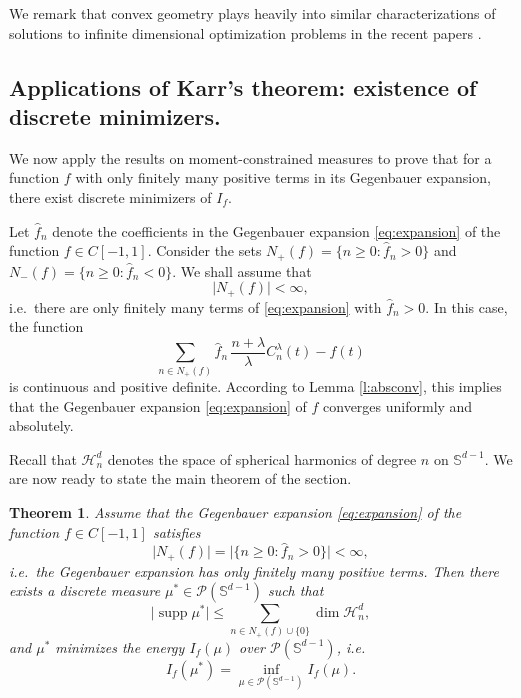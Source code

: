 \documentclass[11pt, leqno]{amsart}
\def\dim{\operatorname{dim}}
\def\S{\mathbb S}
\def\supp{\operatorname{supp}}
\newtheorem{theorem}{Theorem}[section]
\theoremstyle{definition}
\numberwithin{equation}{section}
\begin{document}
We remark that convex geometry plays heavily into similar characterizations of solutions to infinite dimensional optimization problems in the recent papers \cite{boyer,chandra,unser}.


\subsection{Applications of Karr's theorem: existence of discrete minimizers.}
We now apply the results on moment-constrained  measures to prove that for a function $f$ with only finitely many positive terms in its Gegenbauer expansion, there exist discrete minimizers of $I_f$. 

Let $\widehat f_n$ denote the coefficients in the Gegenbauer expansion  \eqref{eq:expansion} of the  function $f\in C[-1,1]$.  
Consider the sets $N_+ (f) = \{ n\ge 0: \widehat f_n > 0\}$ and $N_- (f) = \{ n\ge 0:  \widehat f_n < 0\}$. We shall assume that 
\begin{equation}\label{eq:finpos}
\big| N_+ (f) \big| <\infty,
\end{equation}
 i.e.\ there are only finitely many terms of \eqref{eq:expansion} with $\widehat f_n >0$.  In this case, the function  $$\displaystyle{\sum_{n\in N_+(f) }  \widehat f_n \,\frac{n+\lambda}{\lambda} C_n^\lambda (t) -  f(t) }$$
is continuous and positive definite. According to Lemma \ref{l:absconv}, this implies that the Gegenbauer expansion \eqref{eq:expansion} of $f$ converges uniformly and absolutely.  

Recall that $\mathcal H_n^d$ denotes the space of spherical harmonics of degree $n$ on $\S^{d-1}$. We are now ready to state the main theorem of the section. 

\begin{theorem}\label{thm:discrete}
Assume that the Gegenbauer expansion \eqref{eq:expansion} of the function $f \in C[-1,1]$ satisfies   $$ \big| N_+ (f)  \big|= \big| \{ n\ge 0:  \widehat f_n > 0\} \big| <\infty, $$ i.e.\ the Gegenbauer expansion has only finitely many positive terms. Then there exists a discrete measure $\mu^* \in \mathcal P (\S^{d-1})$ such that
\begin{equation}\label{eq:suppbound}
\big| \supp \mu^*  \big|  \le \sum_{n\in N_+(f) \cup \{0\} }  \dim \mathcal H_n^d,
\end{equation}
and $\mu^*$ minimizes  the energy $I_f (\mu) $ over $\mathcal P (\S^{d-1})$, i.e.
\begin{equation}
I_f (\mu^*) = \inf_{\mu \in \mathcal P (\S^{d-1})} I_f (\mu).
\end{equation}
\end{theorem}
\end{document}
